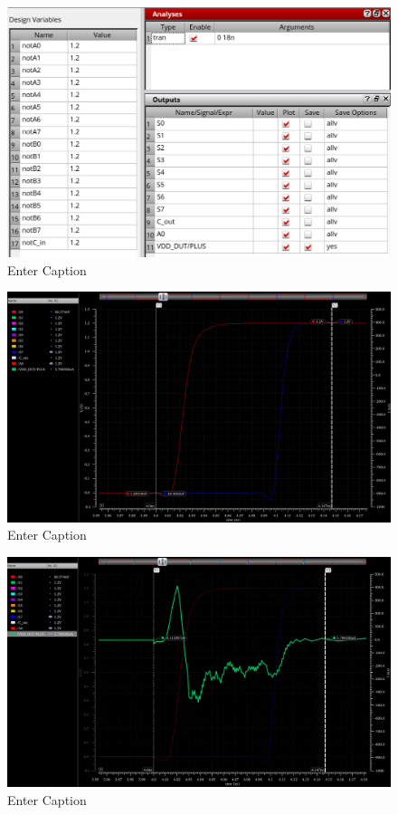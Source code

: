 \documentclass[12pt,letterpaper]{article}
\begin{document}
\begin{figure}[H]
    \centering
    \includegraphics[width=\linewidth]{writeup//figures//baseline//active_energy/max_switching_energy_adel.png}
    \caption{Enter Caption}
\end{figure}

\begin{figure}[H]
    \centering
    \includegraphics[width=1\linewidth]{writeup//figures//baseline//active_energy/max_switching_energy_signals.png}
    \caption{Enter Caption}
\end{figure}

\begin{figure}[H]
    \centering
    \includegraphics[width=1\linewidth]{writeup//figures//baseline//active_energy/max_switching_energy_current.png}
    \caption{Enter Caption}
\end{figure}
\end{document}
